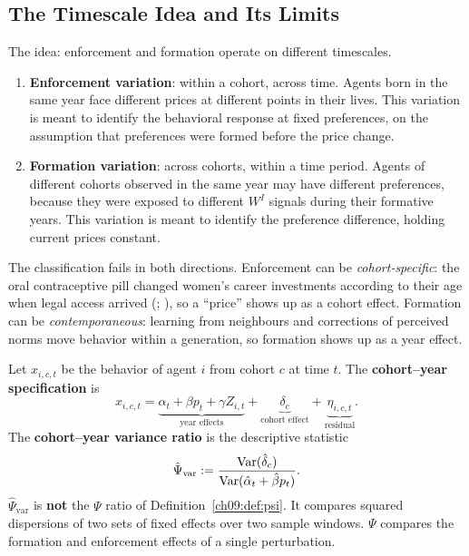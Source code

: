 \documentclass[../structural_economics_book.tex]{subfiles}
\begin{document}
\subsection{The Timescale Idea and Its Limits}

The idea: enforcement and formation operate on different timescales.

\begin{definition}\label{ch11:def:timescale_data}
\begin{enumerate}
\item \textbf{Enforcement variation}: within a cohort, across time. Agents born in the same year face different prices at different points in their lives. This variation is meant to identify the behavioral response at fixed preferences, on the assumption that preferences were formed before the price change.
\item \textbf{Formation variation}: across cohorts, within a time period. Agents of different cohorts observed in the same year may have different preferences, because they were exposed to different $W^I$ signals during their formative years. This variation is meant to identify the preference difference, holding current prices constant.
\end{enumerate}
\end{definition}

The classification fails in both directions. Enforcement can be \textit{cohort-specific}: the oral contraceptive pill changed women's career investments according to their age when legal access arrived (\citealp[\textit{JPE}]{goldin2002power}; \citealp[\textit{QJE}]{bailey2006more}), so a ``price'' shows up as a cohort effect. Formation can be \textit{contemporaneous}: learning from neighbours \citep{fogli2011nature} and corrections of perceived norms \citep{bursztyn2020misperceived} move behavior within a generation, so formation shows up as a year effect.

\begin{definition}\label{ch11:thm:cohort_year}
Let $x_{i,c,t}$ be the behavior of agent $i$ from cohort $c$ at time $t$. The \textbf{cohort--year specification} is
\begin{equation}\label{ch11:eq:cohort_year}
x_{i,c,t} = \underbrace{\alpha_t + \beta p_t + \gamma Z_{i,t}}_{\text{year effects}} + \underbrace{\delta_c}_{\text{cohort effect}} + \underbrace{\eta_{i,c,t}}_{\text{residual}}.
\end{equation}
The \textbf{cohort--year variance ratio} is the descriptive statistic
\begin{equation}\label{ch11:eq:psi_estimate}
\hat{\Psi}_{\text{var}} := \frac{\operatorname{Var}(\hat{\delta}_c)}{\operatorname{Var}(\hat{\alpha}_t + \hat{\beta}p_t)}.
\end{equation}
$\hat{\Psi}_{\text{var}}$ is \textbf{not} the $\Psi$ ratio of Definition~\ref{ch09:def:psi}. It compares squared dispersions of two sets of fixed effects over two sample windows. $\Psi$ compares the formation and enforcement effects of a single perturbation.
\end{definition}
\end{document}

